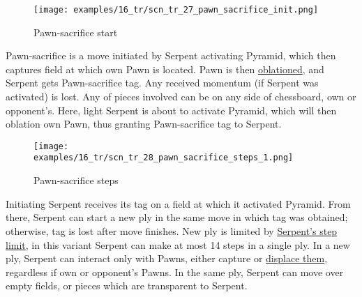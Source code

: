 \vspace*{-0.7\baselineskip}
\noindent
\begin{wrapfigure}[14]{l}{0.4\textwidth}
\centering
\texttt{[image: examples/16\_tr/scn\_tr\_27\_pawn\_sacrifice\_init.png]}
\vspace*{-0.4\baselineskip}
\caption{Pawn-sacrifice start}
\label{fig:scn_tr_27_pawn_sacrifice_init}
\end{wrapfigure}
Pawn-sacrifice is a move initiated by Serpent activating Pyramid, which then
captures field at which own Pawn is located. Pawn is then
\hyperref[sec:Terms/Oblation]{oblationed}, and Serpent gets Pawn-sacrifice
tag. Any received momentum (if Serpent was activated) is lost. Any of pieces
involved can be on any side of chessboard, own or opponent's. \newline
\indent
Here, light Serpent is about to activate Pyramid, which will then oblation
own Pawn, thus granting Pawn-sacrifice tag to Serpent.

\vspace*{0.7\baselineskip}
\noindent
\begin{wrapfigure}[17]{l}{0.4\textwidth}
\centering
\texttt{[image: examples/16\_tr/scn\_tr\_28\_pawn\_sacrifice\_steps\_1.png]}
\vspace*{-0.4\baselineskip}
\caption{Pawn-sacrifice steps}
\label{fig:scn_tr_28_pawn_sacrifice_steps_1}
\end{wrapfigure}
Initiating Serpent receives its tag on a field at which it activated Pyramid.
From there, Serpent can start a new ply in the same move in which tag was obtained;
otherwise, tag is lost after move finishes. New ply is limited by
\hyperref[fig:scn_tr_15_serpent_step_limit]{Serpent's step limit}, in this variant
Serpent can make at most 14 steps in a single ply. \newline
\indent
In a new ply, Serpent can interact only with Pawns, either capture or
\hyperref[fig:scn_tr_20_displacement_step_1]{displace them}, regardless if own or
opponent's Pawns. In the same ply, Serpent can move over empty fields, or pieces
which are transparent to Serpent.

\clearpage %

